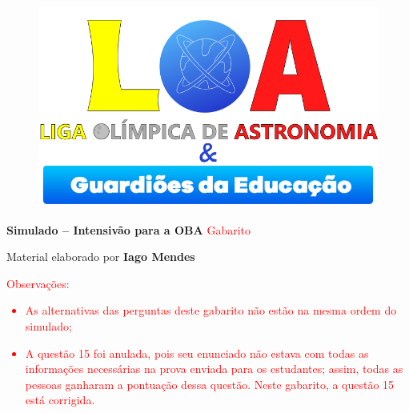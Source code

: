 \documentclass[a4paper, 12pt]{article}
\newcommand{\red}[1]{\textcolor{red}{#1}}
\begin{document}
    \begin{figure}
        \centering
        \href{https://ligaolimpicadeastronomia.com.br/}{\includegraphics[scale=0.6]{./img/logos.png}}
    \end{figure}
    \begin{center}
        \begin{large}
            \textbf{Simulado -- Intensivão para a OBA}
            \linebreak \red{Gabarito}
        \end{large}
        \end{center}
    \begin{flushright}
        Material elaborado por \textbf{Iago Mendes}
    \end{flushright}
    \red{Observações: \begin{itemize}
        \item As alternativas das perguntas deste gabarito não estão na mesma ordem do simulado;
        \item A questão 15 foi anulada, pois seu enunciado não estava com todas as informações necessárias na prova enviada para os estudantes; assim, todas as pessoas ganharam a pontuação dessa questão. Neste gabarito, a questão 15 está corrigida.
    \end{itemize}}
\end{document}
